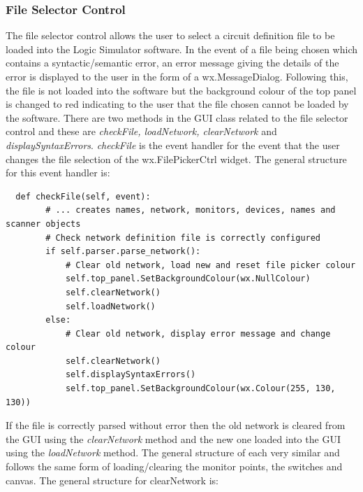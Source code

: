 \documentclass{article}					%
\begin{document}
\begin{figure}[h!]
\begin{centering}
\texttt{[image: \{"panel\_locations"]}.png}
\caption{Graph showing the layout of panels in the Logic Simulator.}
\end{centering}
\end{figure}

\subsubsection{File Selector Control}
The file selector control allows the user to select a circuit definition file to be loaded into the Logic Simulator software. In the event of a file being chosen which contains a syntactic/semantic error, an error message giving the details of the error is displayed to the user in the form of a wx.MessageDialog. Following this, the file is not loaded into the software but the background colour of the top panel is changed to red indicating to the user that the file chosen cannot be loaded by the software. There are two methods in the GUI class related to the file selector control and these are \textit{checkFile, loadNetwork, clearNetwork} and \textit{displaySyntaxErrors}. \textit{checkFile} is the event handler for the event that the user changes the file selection of the wx.FilePickerCtrl widget. The general structure for this event handler is:
\begin{verbatim}
  def checkFile(self, event):
        # ... creates names, network, monitors, devices, names and scanner objects
        # Check network definition file is correctly configured
        if self.parser.parse_network():
            # Clear old network, load new and reset file picker colour
            self.top_panel.SetBackgroundColour(wx.NullColour)
            self.clearNetwork()
            self.loadNetwork()
        else:
            # Clear old network, display error message and change colour
            self.clearNetwork()
            self.displaySyntaxErrors()
            self.top_panel.SetBackgroundColour(wx.Colour(255, 130, 130))
\end{verbatim}
If the file is correctly parsed without error then the old network is cleared from the GUI using the \textit{clearNetwork} method and the new one loaded into the GUI using the \textit{loadNetwork} method. The general structure of each very similar and follows the same form of loading/clearing the monitor points, the switches and canvas. The general structure for clearNetwork is:
\end{document}
